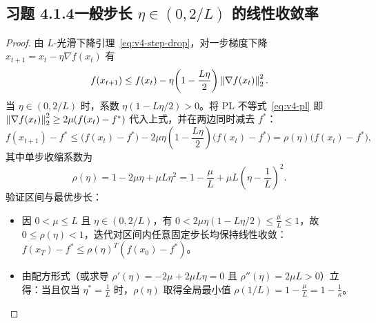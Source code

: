 \subsection*{习题 4.1.4\quad 一般步长 $\eta \in (0, 2/L)$ 的线性收敛率}
\begin{proof}
由 $L$-光滑下降引理~\eqref{eq:v4-step-drop}，对一步梯度下降 $x_{t+1} = x_t - \eta\nabla f(x_t)$ 有
\[
  f(x_{t+1}) \le f(x_t) - \eta\!\left(1 - \frac{L\eta}{2}\right)\left\|\nabla f(x_t)\right\|_2^2.
\]
当 $\eta \in (0, 2/L)$ 时，系数 $\eta(1 - L\eta/2) > 0$。将 PL 不等式~\eqref{eq:v4-pl} 即 $\left\|\nabla f(x_t)\right\|_2^2 \ge 2\mu(f(x_t) - f^*)$ 代入上式，并在两边同时减去 $f^*$：
\[
  f(x_{t+1}) - f^*
  \le \big(f(x_t) - f^*\big) - 2\mu\eta\!\left(1 - \frac{L\eta}{2}\right)\big(f(x_t) - f^*\big)
  = \rho(\eta)\big(f(x_t) - f^*\big),
\]
其中单步收缩系数为
\[
  \rho(\eta) = 1 - 2\mu\eta + \mu L \eta^2 = 1 - \frac{\mu}{L} + \mu L\!\left(\eta - \frac{1}{L}\right)^2.
\]
验证区间与最优步长：
\begin{itemize}
  \item 因 $0 < \mu \le L$ 且 $\eta \in (0, 2/L)$，有 $0 < 2\mu\eta(1 - L\eta/2) \le \frac{\mu}{L} \le 1$，故 $0 \le \rho(\eta) < 1$，迭代对区间内任意固定步长均保持线性收敛：$f(x_T) - f^* \le \rho(\eta)^T (f(x_0) - f^*)$。
  \item 由配方形式（或求导 $\rho'(\eta) = -2\mu + 2\mu L\eta = 0$ 且 $\rho''(\eta) = 2\mu L > 0$）立得：当且仅当 $\eta^* = \frac{1}{L}$ 时，$\rho(\eta)$ 取得全局最小值 $\rho(1/L) = 1 - \frac{\mu}{L} = 1 - \frac{1}{\kappa}$。\qedhere
\end{itemize}
\end{proof}

